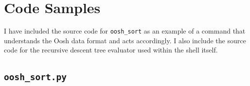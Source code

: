 \documentclass[12pt,twoside,notitlepage]{report}
\begin{document}
\parindent 0pt
\parskip 6pt


\chapter{Code Samples}

I have included the source code for {\tt oosh\_sort} as an example of a
command that understands the Oosh data format and acts accordingly. I
also include the source code for the recursive descent tree evaluator
used within the shell itself.

\section{{\tt oosh\_sort.py}}
\end{document}

